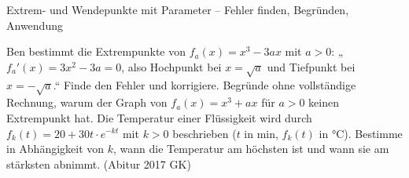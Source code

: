 \begin{aufgabe}{Extrem- und Wendepunkte mit Parameter – Fehler finden, Begründen, Anwendung}
\begin{teile}
\teil Ben bestimmt die Extrempunkte von $f_a(x) = x^3 - 3a x$ mit $a > 0$: „$f_a'(x) = 3x^2 - 3a = 0$, also Hochpunkt bei $x = \sqrt{a}$ und Tiefpunkt bei $x = -\sqrt{a}$.“ Finde den Fehler und korrigiere.
\teil Begründe ohne vollständige Rechnung, warum der Graph von $f_a(x) = x^3 + a x$ für $a > 0$ keinen Extrempunkt hat.
\teil Die Temperatur einer Flüssigkeit wird durch $f_k(t) = 20 + 30t \cdot e^{-kt}$ mit $k > 0$ beschrieben ($t$ in min, $f_k(t)$ in °C). Bestimme in Abhängigkeit von $k$, wann die Temperatur am höchsten ist und wann sie am stärksten abnimmt. \hfill (Abitur 2017 GK)
\end{teile}
\end{aufgabe}

